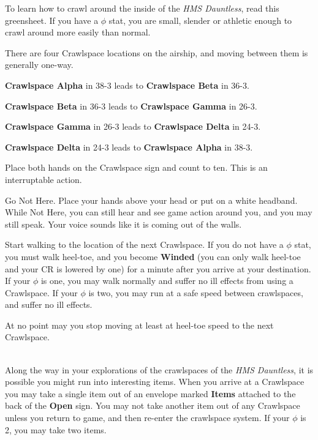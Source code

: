\documentclass[green]{airship}
\begin{document}
\name{\gCrawlspace{}}

To learn how to crawl around the inside of the {\em HMS Dauntless}, read this greensheet. If you have a $\phi$ stat, you are small, slender or athletic enough to crawl around more easily than normal.

There are four Crawlspace locations on the airship, and moving between them is generally one-way.

\begin{enum}[Locations]
  \item {\bf Crawlspace Alpha} in 38-3 leads to {\bf Crawlspace Beta} in 36-3.
  \item {\bf Crawlspace Beta} in 36-3 leads to {\bf Crawlspace Gamma} in 26-3.
  \item {\bf Crawlspace Gamma} in 26-3 leads to {\bf Crawlspace Delta} in 24-3.
  \item {\bf Crawlspace Delta} in 24-3 leads to {\bf Crawlspace Alpha} in 38-3.
\end{enum}

\begin{enum}
  \item Place both hands on the Crawlspace sign and count to ten. This is an interruptable action.
  \item Go Not Here. Place your hands above your head or put on a white headband. While Not Here, you can still hear and see game action around you, and you may still speak. Your voice sounds like it is coming out of the walls.
  \item Start walking to the location of the next Crawlspace. If you do not have a $\phi$ stat, you must walk heel-toe, and you become {\bf Winded} (you can only walk heel-toe and your CR is lowered by one) for a minute after you arrive at your destination. If your $\phi$ is one, you may walk normally and suffer no ill effects from using a Crawlspace. If your $\phi$ is two, you may run at a safe speed between crawlspaces, and suffer no ill effects.
  \item At no point may you stop moving at least at heel-toe speed to the next Crawlspace.
\end{enum}

\\ \indent Along the way in your explorations of the crawlspaces of the {\it HMS Dauntless}, it is possible you might run into interesting items. When you arrive at a Crawlspace you may take a single item out of an envelope marked {\bf Items} attached to the back of the {\bf Open} sign. You may not take another item out of any Crawlspace unless you return to game, and then re-enter the crawlspace system. If your $\phi$ is 2, you may take two items.
\end{document}
